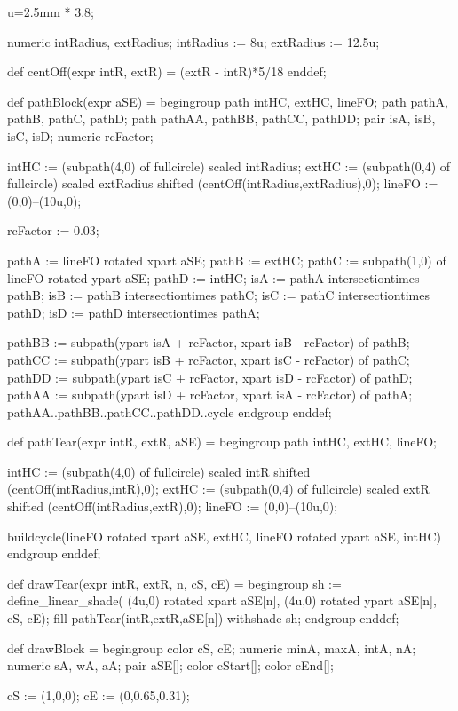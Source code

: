 
\startMPinclusions
u=2.5mm * 3.8;
\stopMPinclusions

numeric intRadius, extRadius;
intRadius := 8u;
extRadius := 12.5u;

def centOff(expr intR, extR) =
(extR - intR)*5/18
enddef;

def pathBlock(expr aSE) =
begingroup
path intHC, extHC, lineFO;
path pathA, pathB, pathC, pathD;
path pathAA, pathBB, pathCC, pathDD;
pair isA, isB, isC, isD;
numeric rcFactor; %

intHC := (subpath(4,0) of fullcircle) scaled intRadius;
extHC := (subpath(0,4) of fullcircle) scaled extRadius shifted (centOff(intRadius,extRadius),0);
lineFO := (0,0)--(10u,0);

rcFactor := 0.03;

pathA := lineFO rotated xpart aSE;
pathB := extHC;
pathC := subpath(1,0) of lineFO rotated ypart aSE;
pathD := intHC;
isA := pathA intersectiontimes pathB;
isB := pathB intersectiontimes pathC;
isC := pathC intersectiontimes pathD;
isD := pathD intersectiontimes pathA;

pathBB := subpath(ypart isA + rcFactor, xpart isB - rcFactor) of pathB;
pathCC := subpath(ypart isB + rcFactor, xpart isC - rcFactor) of pathC;
pathDD := subpath(ypart isC + rcFactor, xpart isD - rcFactor) of pathD;
pathAA := subpath(ypart isD + rcFactor, xpart isA - rcFactor) of pathA;
pathAA..pathBB..pathCC..pathDD..cycle
endgroup
enddef;

def pathTear(expr intR, extR, aSE) =
begingroup
path intHC, extHC, lineFO;

intHC := (subpath(4,0) of fullcircle) scaled intR shifted (centOff(intRadius,intR),0);
extHC := (subpath(0,4) of fullcircle) scaled extR shifted (centOff(intRadius,extR),0);
lineFO := (0,0)--(10u,0);

buildcycle(lineFO rotated xpart aSE, extHC, lineFO rotated ypart aSE, intHC)
endgroup
enddef;

def drawTear(expr intR, extR, n, cS, cE) =
begingroup
	sh := define_linear_shade(
			(4u,0) rotated xpart aSE[n],
			(4u,0) rotated ypart aSE[n],
			cS,
			cE);
	fill pathTear(intR,extR,aSE[n]) withshade sh;
endgroup
enddef;

def drawBlock =
begingroup
color cS, cE;
numeric minA, maxA, intA, nA;
numeric sA, wA, aA;
pair aSE[]; %
color cStart[]; %
color cEnd[];

cS := (1,0,0);
cE := (0,0.65,0.31);


